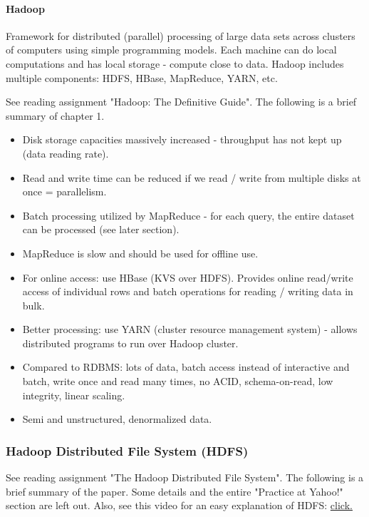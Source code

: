 \paragraph{Hadoop}
Framework for distributed (parallel) processing of large data sets across clusters of computers using simple programming models. Each machine can do local computations and has local storage - compute close to data. Hadoop includes multiple components: HDFS, HBase, MapReduce, YARN, etc.

See reading assignment "Hadoop: The Definitive Guide". The following is a brief summary of chapter 1.

\begin{itemize}
    \item Disk storage capacities massively increased - throughput has not kept up (data reading rate).
    \item Read and write time can be reduced if we read / write from multiple disks at once = parallelism.
    \item Batch processing utilized by MapReduce - for each query, the entire dataset can be processed (see later section).
    \item MapReduce is slow and should be used for offline use. 
    \item For online access: use HBase (KVS over HDFS). Provides online read/write access of individual rows and batch operations for reading / writing data in bulk.
    \item Better processing: use YARN (cluster resource management system) - allows distributed programs to run over Hadoop cluster.
    \item Compared to RDBMS: lots of data, batch access instead of interactive and batch, write once and read many times, no ACID, schema-on-read, low integrity, linear scaling.
    \item Semi and unstructured, denormalized data.
\end{itemize}


\subsubsection{Hadoop Distributed File System (HDFS)}

See reading assignment "The Hadoop Distributed File System". The following is a brief summary of the paper. Some details and the entire "Practice at Yahoo!" section are left out. Also, see this video for an easy explanation of HDFS: \href{https://www.youtube.com/watch?v=4Gfl0WuONMY}{click.}

